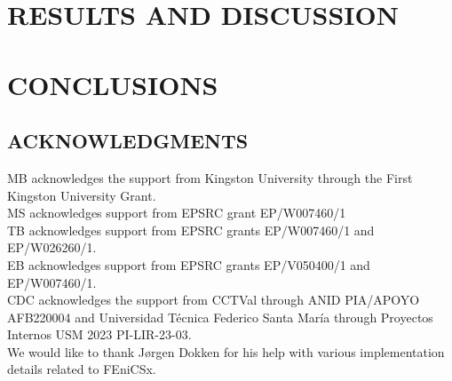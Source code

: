 \documentclass[12pt]{article}
\begin{document}
\section*{\sffamily \Large RESULTS AND DISCUSSION}


 








\section*{\sffamily \Large CONCLUSIONS}




\subsection*{\sffamily \large ACKNOWLEDGMENTS}
MB acknowledges the support from Kingston University through the First Kingston University Grant. \\
MS acknowledges support from EPSRC grant EP/W007460/1 \\
TB acknowledges support from EPSRC grants EP/W007460/1 and EP/W026260/1. \\
EB acknowledges support from EPSRC grants EP/V050400/1 and EP/W007460/1. \\
CDC acknowledges the support from CCTVal through ANID PIA/APOYO AFB220004 and Universidad T\'ecnica Federico Santa Mar\'ia through Proyectos Internos USM 2023 PI-LIR-23-03.\\
We would like to thank J{\o}rgen Dokken for his help with various implementation details related to FEniCSx.
\end{document}
